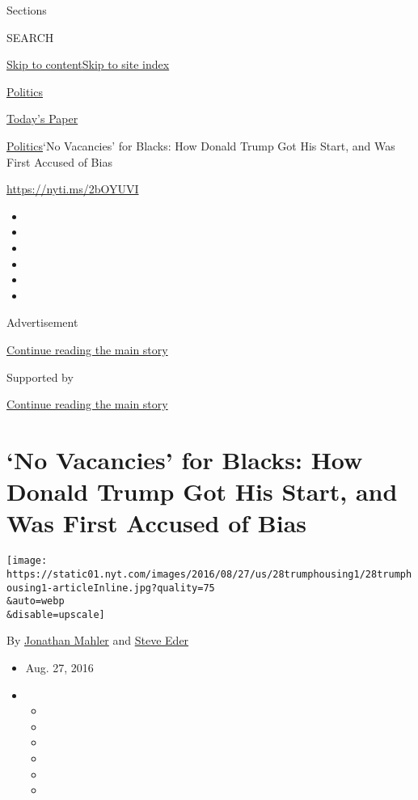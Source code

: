 Sections

SEARCH

\protect\hyperlink{site-content}{Skip to
content}\protect\hyperlink{site-index}{Skip to site index}

\href{https://www.nytimes.com/section/politics}{Politics}

\href{https://myaccount.nytimes.com/auth/login?response_type=cookie\&client_id=vi}{}

\href{https://www.nytimes.com/section/todayspaper}{Today's Paper}

\href{/section/politics}{Politics}\textbar{}`No Vacancies' for Blacks:
How Donald Trump Got His Start, and Was First Accused of Bias

\url{https://nyti.ms/2bOYUVI}

\begin{itemize}
\item
\item
\item
\item
\item
\item
\end{itemize}

Advertisement

\protect\hyperlink{after-top}{Continue reading the main story}

Supported by

\protect\hyperlink{after-sponsor}{Continue reading the main story}

\hypertarget{no-vacancies-for-blacks-how-donald-trump-got-his-start-and-was-first-accused-of-bias}{%
\section{`No Vacancies' for Blacks: How Donald Trump Got His Start, and
Was First Accused of
Bias}\label{no-vacancies-for-blacks-how-donald-trump-got-his-start-and-was-first-accused-of-bias}}

\texttt{[image: https://static01.nyt.com/images/2016/08/27/us/28trumphousing1/28trumphousing1-articleInline.jpg?quality=75\\\&auto=webp\\\&disable=upscale]}

By \href{https://www.nytimes.com/by/jonathan-mahler}{Jonathan Mahler}
and \href{http://www.nytimes.com/by/steve-eder}{Steve Eder}

\begin{itemize}
\item
  Aug. 27, 2016
\item
  \begin{itemize}
  \item
  \item
  \item
  \item
  \item
  \item
  \end{itemize}
\end{itemize}

